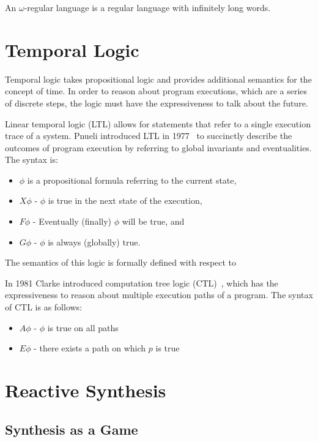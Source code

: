 An $\omega$-regular language is a regular language with infinitely long words.

\section{Temporal Logic}

Temporal logic takes propositional logic and provides additional semantics for
the concept of time. In order to reason about program executions, which are a
series of discrete steps, the logic must have the expressiveness to talk about
the future.

Linear temporal logic (LTL) allows for statements that refer to a single
execution trace of a system.  Pnueli introduced LTL in 1977~\cite{Pnueli77} to
succinctly describe the outcomes of program execution by referring to global
invariants and eventualities. The syntax is:

\begin{itemize}
    \item $\phi$ is a propositional formula referring to the current state,
    \item $X\phi$ - $\phi$ is true in the next state of the execution,
    \item $F\phi$ - Eventually (finally) $\phi$ will be true, and
    \item $G\phi$ - $\phi$ is always (globally) true.
\end{itemize}

The semantics of this logic is formally defined with respect to 

In 1981 Clarke introduced computation tree logic (CTL)~\cite{Clarke81}, which
has the expressiveness to reason about multiple execution paths of a program.
The syntax of CTL is as follows:

\begin{itemize}
    \item $A\phi$ - $\phi$ is true on all paths
    \item $E\phi$ - there exists a path on which $p$ is true
\end{itemize}

\section{Reactive Synthesis}

\subsection{Synthesis as a Game}

